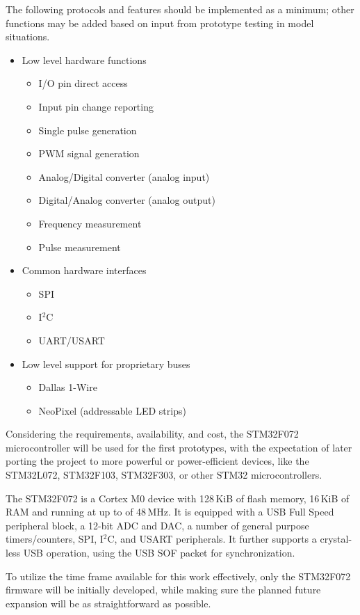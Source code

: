 The following protocols and features should be implemented as a minimum; other functions may be added based on input from prototype testing in model situations.

\begin{itemize}
	\item Low level hardware functions
		\begin{itemize}
			\item I/O pin direct access
			\item Input pin change reporting
			\item Single pulse generation
			\item PWM signal generation
			\item Analog/Digital converter (analog input)
			\item Digital/Analog converter (analog output)
			\item Frequency measurement
			\item Pulse measurement
		\end{itemize}
	\item Common hardware interfaces
		\begin{itemize}
			\item SPI
			\item I$^2$C
			\item UART/USART
		\end{itemize}
	\item Low level support for proprietary buses
		\begin{itemize}
			\item Dallas 1-Wire
			\item NeoPixel (addressable LED strips)
		\end{itemize}
\end{itemize}

Considering the requirements, availability, and cost, the STM32F072 microcontroller will be used for the first prototypes, with the expectation of later porting the project to more powerful or power-efficient devices, like the STM32L072, STM32F103, STM32F303, or other STM32 microcontrollers.

The STM32F072 is a Cortex M0 device with 128\,KiB of flash memory, 16\,KiB of RAM and running at up to of 48\,MHz. It is equipped with a USB Full Speed peripheral block, a 12-bit ADC and DAC, a number of general purpose timers/counters, SPI, I$^2$C, and USART peripherals. It further supports a crystal-less USB operation, using the USB SOF packet for synchronization.

To utilize the time frame available for this work effectively, only the STM32F072 firmware will be initially developed, while making sure the planned future expansion will be as straightforward as possible.





